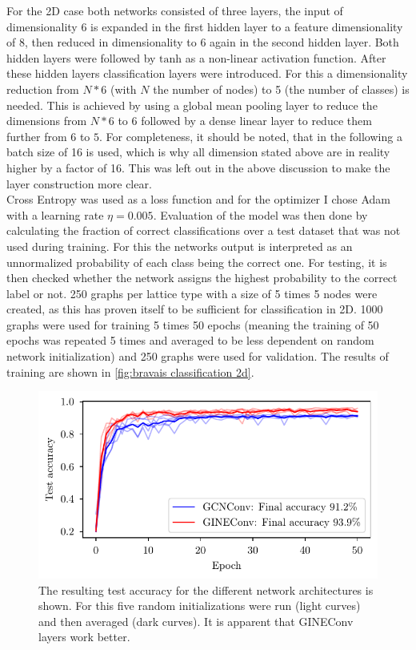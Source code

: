 \documentclass[11pt,a4paper]{article}
\begin{document}
For the 2D case both networks consisted of three layers, the input of dimensionality 6 is expanded in the first hidden layer to a feature dimensionality of 8, then reduced in dimensionality to 6 again in the second hidden layer. 
Both hidden layers were followed by $\mathrm{tanh}$ as a non-linear activation function. 
After these hidden layers classification layers were introduced. 
For this a dimensionality reduction from $N * 6$ (with $N$ the number of nodes) to 5 (the number of classes) is needed. 
This is achieved by using a global mean pooling layer to reduce the dimensions from $N * 6$ to $6$ followed by a dense linear layer to reduce them further from $6$ to $5$. 
For completeness, it should be noted, that in the following a batch size of 16 is used, which is why all dimension stated above are in reality higher by a factor of 16. 
This was left out in the above discussion to make the layer construction more clear. \\
Cross Entropy was used as a loss function and for the optimizer I chose Adam with a learning rate $\eta=0.005$. 
Evaluation of the model was then done by calculating the fraction of correct classifications over a test dataset that was not used during training. 
For this the networks output is interpreted as an unnormalized probability of each class being the correct one. 
For testing, it is then checked whether the network assigns the highest probability to the correct label or not. 
250 graphs per lattice type with a size of 5 times 5 nodes were created, as this has proven itself to be sufficient for classification in 2D. 
1000 graphs were used for training 5 times 50 epochs (meaning the training of 50 epochs was repeated 5 times and averaged to be less dependent on random network initialization) and 250 graphs were used for validation. 
The results of training are shown in \autoref{fig:bravais classification 2d}. 
\begin{figure}[htbp]
    \centering
    \includegraphics{images/plots/2d_classifier_results.pdf}
    \caption{The resulting test accuracy for the different network architectures is shown. For this five random initializations were run (light curves) and then averaged (dark curves). It is apparent that GINEConv layers work better. }
    \label{fig:bravais classification 2d}
\end{figure}
\end{document}
